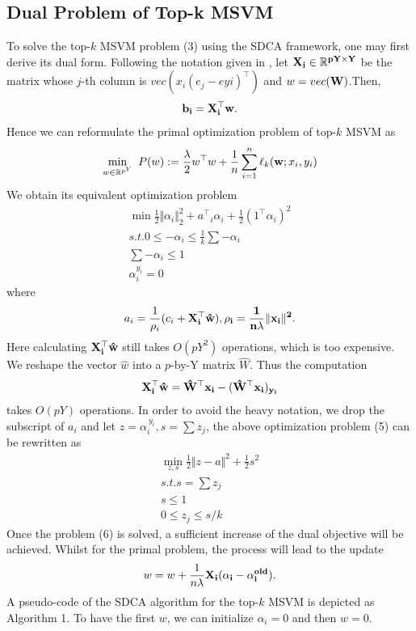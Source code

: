 \documentclass[journal]{IEEEtran}
\begin{document}
\subsection{Dual Problem of Top-k MSVM}
To solve the top-$k$ MSVM problem (3) using the SDCA framework, one may first derive its dual form. Following the notation given in \cite{Shalev-Shwartz2016Accelerated}, let $\bf{X}_i \in \mathbb{R}^{pY \times Y}$ be the matrix whose $j$-th column is $vec(x_i(e_j-e{yi})^\top{})$ and $w = vec(\bf{W})$.Then,
\begin{equation*}
	\bf{b}_i = \bf{X}_i^\top{}w.
\end{equation*}
Hence we can reformulate the primal optimization problem of top-$k$ MSVM as
\begin{equation}
	\min\limits_{w\in \mathbb{R}^{p^Y}}~P(w):=\frac{\lambda}{2}w^\top{}w+\frac{1}{n}\sum\limits_{i=1}^n\ell_k({\bf{w}};x_i, y_i)
\end{equation}
We obtain its equivalent optimization problem
\begin{align}
	\min\frac{1}{2}\Vert\alpha_i\Vert_2^2 + a^\top{}_i\alpha_i + \frac{1}{2}(1^\top{}\alpha_i)^2 \nonumber \\
	s.t. 0 \leq -\alpha_i \leq \frac{1}{k}\sum-\alpha_i \\
	\sum-\alpha_i \leq 1 \nonumber \\
	\alpha_i^{y_i} = 0 \nonumber
\end{align}
where
\begin{equation*}
	a_i = \frac{1}{\rho_i}(c_i+\bf{X}_i^\top{}\hat{w}), \rho_i = \frac{1}{n\lambda}\Vert x_i \Vert^2.
\end{equation*}
Here calculating $\bf{X}_i^\top{}\hat{w}$ still takes $O(pY^2)$ operations, which is too expensive. We reshape the vector $\hat{w}$ into a $p$-by-Y matrix $\hat{W}$. Thus the computation
\begin{equation*}
	\bf{X}_i^\top{}\hat{w} = \hat{W}^\top{}x_i - (\hat{W}^\top{}x_i)_{y_i}
\end{equation*}
takes $O(pY)$ operations. In order to avoid the heavy notation, we drop the subscript of $a_i$ and let $z = \alpha_i^{\ y_i}, s = \sum z_j$, the above optimization problem (5) can be rewritten as
\begin{align}
	\min\limits_{z,s}\frac{1}{2}\Vert z-a \Vert^2 + \frac{1}{2}s^2 \nonumber \\
	s.t. s = \sum z_j \\
	s \leq 1 \nonumber \\
	0 \leq z_j \leq s/k \nonumber
\end{align}
Once the problem (6) is solved, a sufficient increase of the dual objective will be achieved. Whilst for the primal problem, the process will lead to the update
\begin{equation}
	w = w + \frac{1}{n\lambda}\bf{X}_i(\alpha_i - \alpha_i^{old}).
\end{equation}
A pseudo-code of the SDCA algorithm for the top-$k$ MSVM is depicted as Algorithm 1. To have the first $w$, we can initialize $\alpha_i = 0$ and then $w = 0$.
\end{document}
